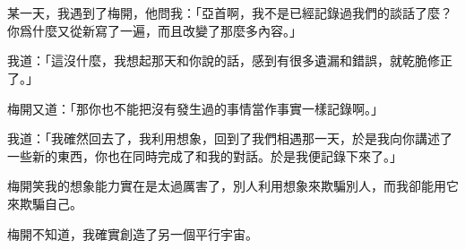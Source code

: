 \chapter*{}
某一天，我遇到了梅開，他問我：「亞首啊，我不是已經記錄過我們的談話了麼？你爲什麼又從新寫了一遍，而且改變了那麼多內容。」

我道：「這沒什麼，我想起那天和你說的話，感到有很多遺漏和錯誤，就乾脆修正了。」

梅開又道：「那你也不能把沒有發生過的事情當作事實一樣記錄啊。」

我道：「我確然回去了，我利用想象，回到了我們相遇那一天，於是我向你講述了一些新的東西，你也在同時完成了和我的對話。於是我便記錄下來了。」

梅開笑我的想象能力實在是太過厲害了，別人利用想象來欺騙別人，而我卻能用它來欺騙自己。

梅開不知道，我確實創造了另一個平行宇宙。
